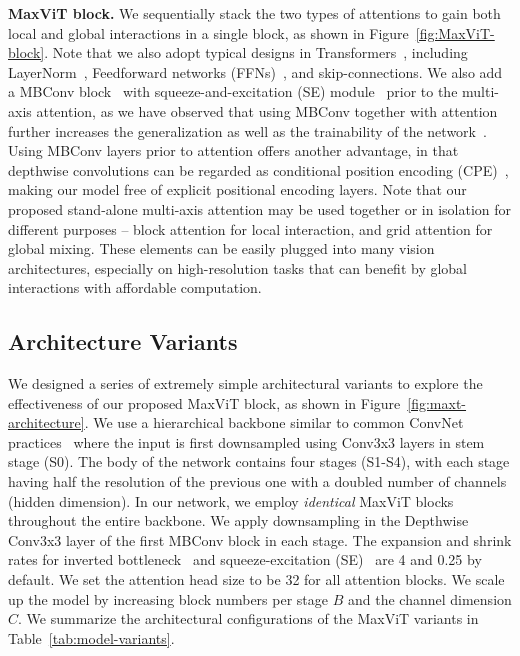 \documentclass[runningheads]{llncs}
\begin{document}
\noindent\textbf{MaxViT block.} We sequentially stack the two types of attentions to gain both local and global interactions in a single block, as shown in Figure~\ref{fig:MaxViT-block}.
Note that we also adopt typical designs in Transformers~\cite{dosovitskiy2020image,liu2021swin}, including LayerNorm~\cite{ba2016layer}, Feedforward networks (FFNs)~\cite{dosovitskiy2020image,liu2021swin}, and skip-connections.
We also add a MBConv block~\cite{howard2017mobilenets} with  squeeze-and-excitation (SE) module~\cite{hu2018squeeze} prior to the multi-axis attention, as we have observed that using MBConv together with attention further increases the generalization as well as the trainability of the network~\cite{xiao2021early}.
Using MBConv layers prior to attention offers another advantage, in that depthwise convolutions can be regarded as conditional position encoding (CPE)~\cite{chu2021conditional}, making our model free of explicit positional encoding layers.
Note that our proposed stand-alone multi-axis attention may be used together or in isolation for different purposes -- block attention for local interaction, and grid attention for global mixing.
These elements can be easily plugged into many vision architectures, especially on high-resolution tasks that can benefit by global interactions with affordable computation.


\subsection{Architecture Variants}
We designed a series of extremely simple architectural variants to explore the effectiveness of our proposed MaxViT block, as shown in Figure~\ref{fig:maxt-architecture}.
We use a hierarchical backbone similar to common ConvNet practices~\cite{he2016deep,liu2022convnet,dai2021coatnet,tan2021efficientnetv2} where the input is first downsampled using Conv3x3 layers in stem stage (S0).
The body of the network contains four stages (S1-S4), with each stage having half the resolution of the previous one with a doubled number of channels (hidden dimension).
In our network, we employ \textit{identical} MaxViT blocks throughout the entire backbone.
We apply downsampling in the Depthwise Conv3x3 layer of the first MBConv block in each stage.
The expansion and shrink rates for inverted bottleneck~\cite{howard2017mobilenets} and squeeze-excitation (SE)~\cite{hu2018squeeze} are 4 and 0.25 by default.
We set the attention head size to be 32 for all attention blocks. We scale up the model by increasing block numbers per stage $B$ and the channel dimension $C$.
We summarize the architectural configurations of the MaxViT variants in Table~\ref{tab:model-variants}.
\end{document}
